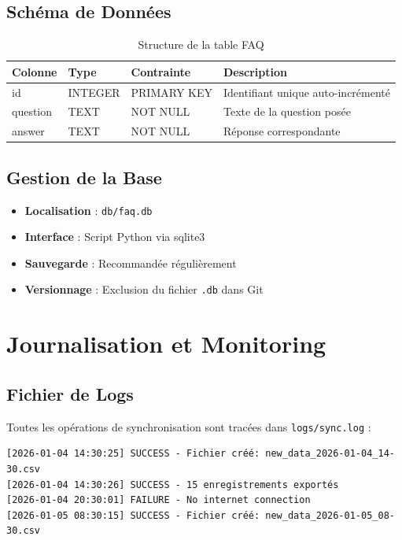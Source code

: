 \documentclass[11pt,a4paper]{article}
\begin{document}
\subsection{Schéma de Données}
\begin{table}[H]
    \centering
    \begin{tabularx}{\textwidth}{|X|X|X|X|}
        \hline
        \textbf{Colonne} & \textbf{Type} & \textbf{Contrainte} & \textbf{Description} \\
        \hline
        id & INTEGER & PRIMARY KEY & Identifiant unique auto-incrémenté \\
        \hline
        question & TEXT & NOT NULL & Texte de la question posée \\
        \hline
        answer & TEXT & NOT NULL & Réponse correspondante \\
        \hline
    \end{tabularx}
    \caption{Structure de la table FAQ}
\end{table}

\subsection{Gestion de la Base}
\begin{itemize}
    \item \textbf{Localisation} : \texttt{db/faq.db}
    \item \textbf{Interface} : Script Python via sqlite3
    \item \textbf{Sauvegarde} : Recommandée régulièrement
    \item \textbf{Versionnage} : Exclusion du fichier \texttt{.db} dans Git
\end{itemize}

\section{Journalisation et Monitoring}
\label{sec:logging}

\subsection{Fichier de Logs}
Toutes les opérations de synchronisation sont tracées dans \texttt{logs/sync.log} :

\begin{lstlisting}
[2026-01-04 14:30:25] SUCCESS - Fichier créé: new_data_2026-01-04_14-30.csv
[2026-01-04 14:30:26] SUCCESS - 15 enregistrements exportés
[2026-01-04 20:30:01] FAILURE - No internet connection
[2026-01-05 08:30:15] SUCCESS - Fichier créé: new_data_2026-01-05_08-30.csv
\end{lstlisting}
\end{document}
